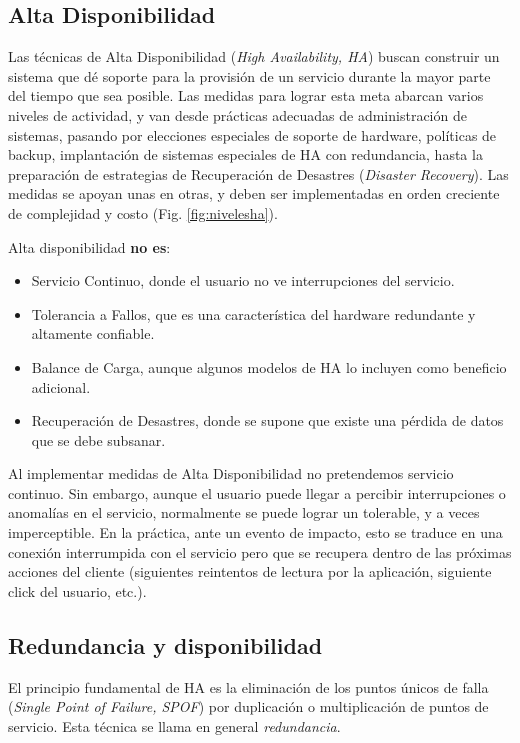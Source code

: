 \subsection{Alta Disponibilidad}

Las técnicas de Alta Disponibilidad (\textit{High Availability, HA}) buscan construir un sistema que dé soporte para la provisión de un servicio durante la mayor parte del tiempo que sea posible. Las medidas para lograr esta meta abarcan varios niveles de actividad, y van desde prácticas adecuadas de administración de sistemas, pasando por elecciones especiales de soporte de hardware, políticas de backup, implantación de sistemas especiales de HA con redundancia, hasta la preparación de estrategias de Recuperación de Desastres (\textit{Disaster Recovery}). Las medidas se apoyan unas en otras, y deben ser implementadas en orden creciente de complejidad y costo (Fig. \ref{fig:nivelesha}). 


Alta disponibilidad \textbf{no es}:
\begin{itemize}
	\item Servicio Continuo, donde el usuario no ve interrupciones del servicio.
	\item Tolerancia a Fallos, que es una característica del hardware redundante y altamente confiable.
	\item Balance de Carga, aunque algunos modelos de HA lo incluyen como beneficio adicional.
	\item Recuperación de Desastres, donde se supone que existe una pérdida de datos que se debe subsanar.
\end{itemize}

Al implementar medidas de Alta Disponibilidad no pretendemos servicio continuo. Sin embargo, aunque el usuario puede llegar a percibir interrupciones o anomalías en el servicio, normalmente se puede lograr un  tolerable, y a veces imperceptible. En la práctica, ante un evento de impacto, esto se traduce en una conexión interrumpida con el servicio pero que se recupera dentro de las próximas acciones del cliente (siguientes reintentos de lectura por la aplicación, siguiente click del usuario, etc.). 

\subsection{Redundancia y disponibilidad}
El principio fundamental de HA es la eliminación de los puntos únicos de falla (\textit{Single Point of Failure, SPOF}) por duplicación o multiplicación de puntos de servicio. Esta técnica se llama en general \textit{redundancia}. 

